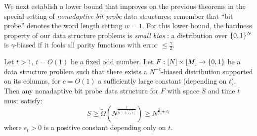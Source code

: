 We next establish a lower bound that improves on the previous theorems in the special setting of \emph{nonadaptive bit probe} data structures; remember that ``bit probe'' denotes the word length setting $w= 1$. For this lower bound, the hardness property of our data structure problems is \emph{small bias} \cite{naornaor}: a distribution over $\{0,1\}^N$ is $\gamma$-biased if it fools all parity functions with error $\leq \frac{\gamma}{2}$.
\begin{theorem}
\label{cellprobe:thm:biased-lb}
Let $t>1$, $t = O(1)$ be a fixed odd number.  Let $F:[N] \times [M] \to \{0,1\}$ be a data structure problem such that there exists a $N^{-c}$-biased distribution supported on its columns, for $c=O(1)$ a sufficiently large constant (depending on $t$). Then any nonadaptive bit probe data structure for $F$ with space $S$ and time $t$ must satisfy:
\[
S \geq \tilde{\Omega}(N^{\frac{1}{\frac{t}{2} -\frac{t- 2}{2(t+2)}}})  \geq N^{\frac{2}{t} + \epsilon_t}
\]
where $\epsilon_t > 0$ is a positive constant depending only on $t$.
\end{theorem}

